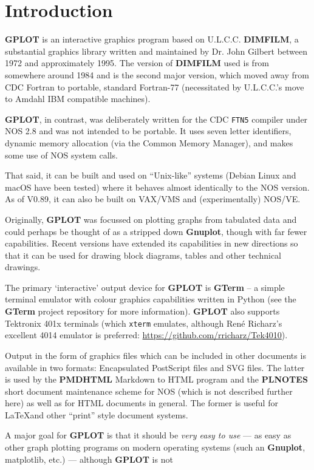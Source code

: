 \documentclass[a4paper,twoside,11pt]{article}
\newcommand{\newpara}{\par\vspace{4mm}\noindent}
\begin{document}
\section{Introduction}
\newpara
\textbf{GPLOT} is an interactive graphics program based on U.L.C.C. \textbf{DIMFILM}, a substantial graphics
library written and maintained
by Dr. John Gilbert between 1972 and approximately 1995. The version of \textbf{DIMFILM} used is
from somewhere around 1984 and is the second major version, which moved away from CDC Fortran
to portable, standard Fortran-77 (necessitated by U.L.C.C.'s move to Amdahl IBM compatible machines). 
\newpara
\textbf{GPLOT}, in contrast, was deliberately written for the CDC \texttt{FTN5} compiler under NOS 2.8 and
was not intended to be portable. It uses seven letter identifiers, dynamic memory allocation (via
the Common Memory Manager), and makes some use of NOS system calls.
\newpara
That said, it can be built and used on ``Unix-like'' systems (Debian Linux and macOS have been tested)
where it behaves almost identically to the NOS version. As of V0.89, it can also be built on VAX/VMS and
(experimentally) NOS/VE.
\newpara
Originally, \textbf{GPLOT} was focussed on plotting graphs from tabulated data and could perhaps be thought of
as a stripped down \textbf{Gnuplot}, though with far fewer capabilities.
Recent versions have extended its capabilities in new directions so that it can be used for drawing block diagrams,
tables and other technical drawings.
\newpara
The primary `interactive' output device for \textbf{GPLOT} is \textbf{GTerm} -- a simple terminal emulator with colour graphics
capabilities written in Python (see the \textbf{GTerm} project repository for more information). \textbf{GPLOT} also 
supports Tektronix 401x terminals (which \texttt{xterm} emulates, although Ren\'{e} Richarz's
excellent 4014 emulator is preferred: \url{https://github.com/rricharz/Tek4010}).
\newpara
Output in the form of graphics files which  can be included in other documents is available in two formats:
Encapsulated PostScript files and SVG files. The latter is 
used by the \textbf{PMDHTML} Markdown to HTML program and the \textbf{PLNOTES} short document maintenance scheme for NOS
(which is not described further here) as well as for HTML documents in general. The former is useful for \LaTeX and other
``print'' style document systems.
\newpara
A major goal for \textbf{GPLOT} is that it should be \textit{very easy to use} --- as easy as other graph plotting
programs on modern operating systems (such an \textbf{Gnuplot}, matplotlib, etc.) --- although \textbf{GPLOT} is not
\end{document}
